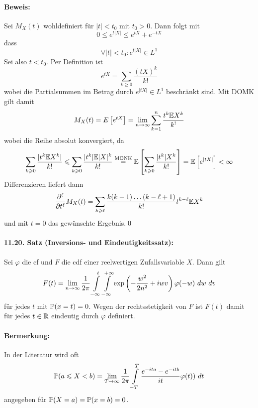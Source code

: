 \paragraph{Beweis:} Sei $M_X(t)$ wohldefiniert f\"ur $|t|<t_0$ mit $t_0>0$. Dann folgt mit
$$0\leq e^{t|X|}\leq e^{tX}+e^{-tX}$$
dass
$$\forall |t|<t_0:e^{t|X|}\in L^1$$
Sei also $t<t_0$. Per Definition ist 
$$e^{tX}=\sum_{k\geq0}\dfrac{(tX)^k}{k!}$$
wobei die Partialsummen im Betrag durch $e^{|tX|}\in L^1$ beschr\"ankt sind. Mit DOMK gilt damit 
$$M_X(t)=\\E\left[e^{tX}\right]=\lim_{n\to\infty}\sum_{k=1}^n\dfrac{t^k\mathbb{E} X^k}{k^!}$$
wobei die Reihe absolut konvergiert, da
$$\sum_{k\geqslant0}\dfrac{|t^k\mathbb{E} X^k|}{k!}\leqslant\sum_{k\geqslant0}\dfrac{|t^k|\mathbb{E} |X|^k}{k!}\overset{\text{MONK}}{=}\mathbb{E}\left[\sum_{k\geqslant0}\dfrac{|t^k|X^k}{k!}\right]=\mathbb{E}\left[ e^{|tX|}\right]<\infty$$
Differenzieren liefert dann
$$\dfrac{\partial^\ell}{\partial t^\ell}M_X(t)=\sum_{k\geqslant\ell}\dfrac{k(k-1)\hdots(k-\ell+1)}{k!}t^{k-\ell}\mathbb{E} X^k$$
und mit $t=0$ das gew\"unschte Ergebnis.\qed

\paragraph{11.20. Satz (Inversions- und Eindeutigkeitssatz):} Sei $\varphi$ die cf und $F$ die cdf einer reelwertigen Zufallsvariable $X$. Dann gilt
$$F(t)=\lim_{n\to\infty}\dfrac{1}{2\pi}\int\displaylimits_{-\infty}^t\int\displaylimits_{-\infty}^{+\infty}\exp\left(-\dfrac{w^2}{2n^2}+iwv\right)\varphi(-w)\ dw\ dv$$
f\"ur jedes $t$ mit $\mathbb{P}(x=t)=0$. Wegen der rechtsstetigkeit von $F$ ist $F(t)$ damit f\"ur jedes $t\in\mathbb{R}$ eindeutig durch $\varphi$ definiert. 

\paragraph{Bermerkung:} In der Literatur wird oft 
$$\Pp(a\leq X<b)=\lim_{T\to\infty}\dfrac{1}{2\pi}\int\displaylimits_{-T}^T\dfrac{e^{-ita}-e^{-itb}}{it}\varphi(t))\ dt$$
angegeben f\"ur $\mathbb{P}(X=a)=\mathbb{P}(x=b)=0$.

